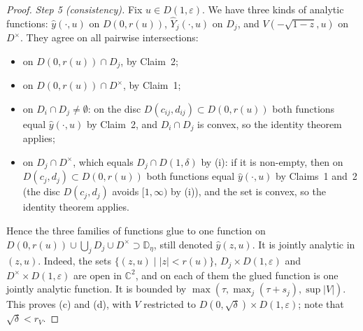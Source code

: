 \documentclass[11pt]{amsart}
\theoremstyle{definition}
\theoremstyle{remark}
\numberwithin{equation}{section}
\newcommand{\CC}{\mathbb{C}}
\newcommand{\DD}{\mathbb{D}}
\newcommand{\abs}[1]{\lvert #1\rvert}
\begin{document}
\begin{proof}
\emph{Step 5 (consistency).} Fix \(u\in D(1,\varepsilon)\). We have three kinds of analytic functions: \(\hat y(\cdot,u)\) on \(D(0,r(u))\), \(\hat Y_j(\cdot,u)\) on \(D_j\), and \(V(-\sqrt{1-z},u)\) on \(D^{\times}\). They agree on all pairwise intersections:
\begin{itemize}
\item on \(D(0,r(u))\cap D_j\), by Claim~2;
\item on \(D(0,r(u))\cap D^{\times}\), by Claim~1;
\item on \(D_i\cap D_j\ne\emptyset\): on the disc \(D(c_{ij},d_{ij})\subset D(0,r(u))\) both functions equal \(\hat y(\cdot,u)\) by Claim~2, and \(D_i\cap D_j\) is convex, so the identity theorem applies;
\item on \(D_j\cap D^{\times}\), which equals \(D_j\cap D(1,\delta)\) by (i): if it is non-empty, then on \(D(c_j,d_j)\subset D(0,r(u))\) both functions equal \(\hat y(\cdot,u)\) by Claims~1 and~2 (the disc \(D(c_j,d_j)\) avoids \([1,\infty)\) by (i)), and the set is convex, so the identity theorem applies.
\end{itemize}
Hence the three families of functions glue to one function on \(D(0,r(u))\cup\bigcup_jD_j\cup D^{\times}\supset\DD_\eta\), still denoted \(\hat y(z,u)\). It is jointly analytic in \((z,u)\). Indeed, the sets \(\{(z,u)\mid\abs{z}<r(u)\}\), \(D_j\times D(1,\varepsilon)\) and \(D^{\times}\times D(1,\varepsilon)\) are open in \(\CC^2\), and on each of them the glued function is one jointly analytic function. It is bounded by \(\max(\tau,\max_j(\tau+s_j),\sup\abs{V})\). This proves (c) and (d), with \(V\) restricted to \(D(0,\sqrt\delta)\times D(1,\varepsilon)\); note that \(\sqrt\delta<r_V\).
\end{proof}
\end{document}
